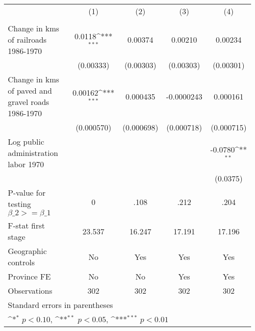 {
\def\sym#1{\ifmmode^{#1}\else\(^{#1}\)\fi}
\begin{tabular}{l*{4}{c}}
\hline\hline
                &\multicolumn{1}{c}{(1)}&\multicolumn{1}{c}{(2)}&\multicolumn{1}{c}{(3)}&\multicolumn{1}{c}{(4)}\\
                &\multicolumn{1}{c}{}&\multicolumn{1}{c}{}&\multicolumn{1}{c}{}&\multicolumn{1}{c}{}\\
\hline
Change in kms of railroads 1986-1970&   0.0118\sym{***}&  0.00374         &  0.00210         &  0.00234         \\
                &(0.00333)         &(0.00303)         &(0.00303)         &(0.00301)         \\
[1em]
Change in kms of paved and gravel roads 1986-1970&  0.00162\sym{***}& 0.000435         &-0.0000243         & 0.000161         \\
                &(0.000570)         &(0.000698)         &(0.000718)         &(0.000715)         \\
[1em]
Log public administration labor 1970&                  &                  &                  &  -0.0780\sym{**} \\
                &                  &                  &                  & (0.0375)         \\
\hline
P-value for testing $\beta\_{2} >= \beta\_{1}$&        0         &     .108         &     .212         &     .204         \\
F-stat first stage&   23.537         &   16.247         &   17.191         &   17.196         \\
Geographic controls&       No         &      Yes         &      Yes         &      Yes         \\
Province FE     &       No         &       No         &      Yes         &      Yes         \\
Observations    &      302         &      302         &      302         &      302         \\
\hline\hline
\multicolumn{5}{l}{\footnotesize Standard errors in parentheses}\\
\multicolumn{5}{l}{\footnotesize \sym{*} \(p<0.10\), \sym{**} \(p<0.05\), \sym{***} \(p<0.01\)}\\
\end{tabular}
}
